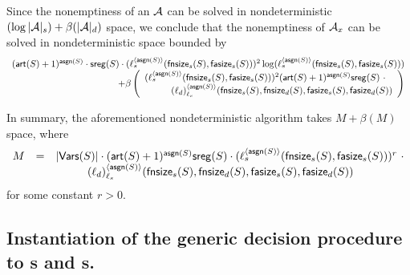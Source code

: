 Since the nonemptiness of an \SA{} $\mathcal{A}$ can be solved in nondeterministic $(\log |\mathcal{A}|_s) + \beta(|\mathcal{A}|_d)$ space, we conclude that the nonemptiness of $\mathcal{A}_x$ can be solved in nondeterministic space bounded by 
{\small
$$
\begin{array}{l}
(\rcdim(S)+1)^{\rcdep(S)} \cdot \rcsreg(S) \cdot (\ell_s^{\langle \rcdep(S) \rangle}(\rcphi_s(S), \rcpsi_s(S)))^2 \log (\ell^{\langle \rcdep(S) \rangle}_s(\rcphi_s(S), \rcpsi_s(S))) \\
\hfill +\beta
\left(
\begin{array}{l}
(\ell_s^{\langle \rcdep(S) \rangle}(\rcphi_s(S), \rcpsi_s(S)))^2 (\rcdim(S)+1)^{\rcdep(S)} \rcsreg(S)\ \cdot  \\
\hspace{1cm} (\ell_d)^{\langle  \rcdep(S) \rangle}_{\ell_s}(\rcphi_s(S),\rcphi_d(S),  \rcpsi_s(S), \rcpsi_d(S))
\end{array}
\right)
\end{array}
$$
}


In summary, the aforementioned nondeterministic algorithm takes  $M + \beta(M)$ space, where 
%
$$
\begin{array}{l c l}
M & = & |\mathsf{Vars}(S)| \cdot (\mathsf{art}(S)+1)^{\mathsf{asgn}(S)}  \mathsf{sreg}(S) \cdot  (\ell_s^{\langle \mathsf{asgn}(S) \rangle}(\mathsf{fnsize}_s(S), \mathsf{fasize}_s(S)))^{r}\ \cdot \\
& &  \hspace{1cm} (\ell_d)^{\langle  \mathsf{asgn}(S) \rangle}_{\ell_s}(\mathsf{fnsize}_s(S),\mathsf{fnsize}_d(S),  \mathsf{fasize}_s(S), \mathsf{fasize}_d(S))
\end{array}
$$
%
for some constant $r > 0$.



\subsection{Instantiation of the generic decision procedure to \SSPT{}s and \SPT{}s.}



